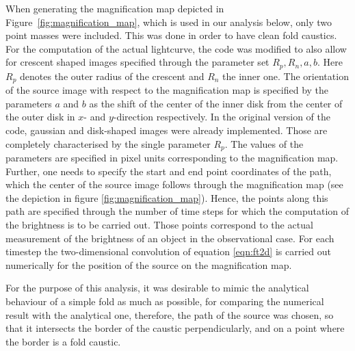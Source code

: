 \documentclass[usenatbib]{mn2e}
\begin{document}
When generating the magnification map depicted in
Figure~\ref{fig:magnification_map}, which is used in our analysis
below, only two point masses were included.  This was done in order to
have clean fold caustics.  For the computation of the actual
lightcurve, the code was modified to also allow for crescent shaped
images specified through the parameter set $R_p,R_n,a,b$. Here $R_p$
denotes the outer radius of the crescent and $R_n$ the inner one. The
orientation of the source image with respect to the magnification map
is specified by the parameters $a$ and $b$ as the shift of the center
of the inner disk from the center of the outer disk in $x$- and
$y$-direction respectively. In the original version of the code,
gaussian and disk-shaped images were already implemented. Those are
completely characterised by the single parameter $R_p$. The values of
the parameters are specified in pixel units corresponding to the
magnification map. Further, one needs to specify the start and end
point coordinates of the path, which the center of the source image
follows through the magnification map (see the depiction in figure
\ref{fig:magnification_map}). Hence, the points along this path are
specified through the number of time steps for which the computation of
the brightness is to be carried out. Those points correspond to the
actual measurement of the brightness of an object in the observational
case. For each timestep the two-dimensional convolution of equation
\ref{eqn:ft2d} is carried out numerically for the position of the
source on the magnification map.

For the purpose of this analysis, it was desirable to mimic the
analytical behaviour of a simple fold as much as possible, for
comparing the numerical result with the analytical one, therefore, the
path of the source was chosen, so that it intersects the border of the
caustic perpendicularly, and on a point where the border is a fold
caustic.
\end{document}

